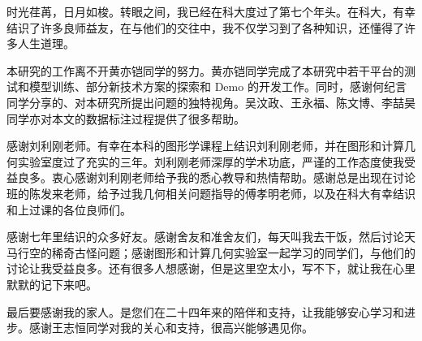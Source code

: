 
\begin{acknowledgements}

时光荏苒，日月如梭。转眼之间，我已经在科大度过了第七个年头。在科大，有幸结识了许多良师益友，在与他们的交往中，我不仅学习到了各种知识，还懂得了许多人生道理。

本研究的工作离不开黄亦铠同学的努力。黄亦铠同学完成了本研究中若干平台的测试和模型训练、部分新技术方案的探索和 Demo 的开发工作。同时，感谢何纪言同学分享的、对本研究所提出问题的独特视角。吴汶政、王永福、陈文博、李喆昊同学亦对本文的数据标注过程提供了很多帮助。

感谢刘利刚老师。有幸在本科的图形学课程上结识刘利刚老师，并在图形和计算几何实验室度过了充实的三年。刘利刚老师深厚的学术功底，严谨的工作态度使我受益良多。衷心感谢刘利刚老师给予我的悉心教导和热情帮助。感谢总是出现在讨论班的陈发来老师，给予过我几何相关问题指导的傅孝明老师，以及在科大有幸结识和上过课的各位良师们。

感谢七年里结识的众多好友。感谢舍友和准舍友们，每天叫我去干饭，然后讨论天马行空的稀奇古怪问题；感谢图形和计算几何实验室一起学习的同学们，与他们的讨论让我受益良多。还有很多人想感谢，但是这里空太小，写不下，就让我在心里默默的记下来吧。

最后要感谢我的家人。是您们在二十四年来的陪伴和支持，让我能够安心学习和进步。感谢王志恒同学对我的关心和支持，很高兴能够遇见你。



\end{acknowledgements}
